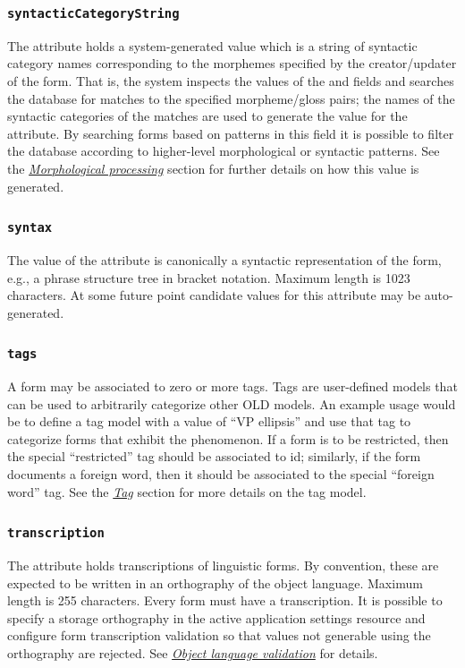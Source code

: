 \documentclass[letterpaper,10pt,english]{sphinxmanual}
\begin{document}
\subsubsection{\texttt{syntacticCategoryString}}
\label{datastructure:syntacticcategorystring}
The  attribute holds a system-generated value which
is a string of syntactic category names corresponding to the morphemes specified
by the creator/updater of the form.  That is, the system inspects the values of
the  and  fields and searches the database for
matches to the specified morpheme/gloss pairs; the names of the syntactic
categories of the matches are used to generate the value for the
 attribute.  By searching forms based on patterns in
this field it is possible to filter the database according to higher-level
morphological or syntactic patterns.  See the {\hyperref[interface:morphological-processing]{\emph{Morphological processing}}}
section for further details on how this value is generated.


\subsubsection{\texttt{syntax}}
\label{datastructure:syntax}
The value of the  attribute is canonically a syntactic representation
of the form, e.g., a phrase structure tree in bracket notation.  Maximum length
is 1023 characters.  At some future point candidate values for this attribute
may be auto-generated.


\subsubsection{\texttt{tags}}
\label{datastructure:id27}
A form may be associated to zero or more tags.  Tags are user-defined models
that can be used to arbitrarily categorize other OLD models.  An example usage
would be to define a tag model with a  value of ``VP ellipsis'' and use
that tag to categorize forms that exhibit the phenomenon.  If a form is to be
restricted, then the special ``restricted'' tag should be associated to id;
similarly, if the form documents a foreign word, then it should be associated to
the special ``foreign word'' tag.  See the {\hyperref[datastructure:tag-data-structure]{\emph{Tag}}} section for
more details on the tag model.


\subsubsection{\texttt{transcription}}
\label{datastructure:transcription}
The  attribute holds transcriptions of linguistic forms.  By
convention, these are expected to be written in an orthography of the object
language.  Maximum length is 255 characters.  Every form must have a
transcription.  It is possible to specify a storage orthography in the active
application settings resource and configure form transcription validation so
that values not generable using the orthography are rejected.  See
{\hyperref[interface:object-language-validation]{\emph{Object language validation}}} for details.
\end{document}
